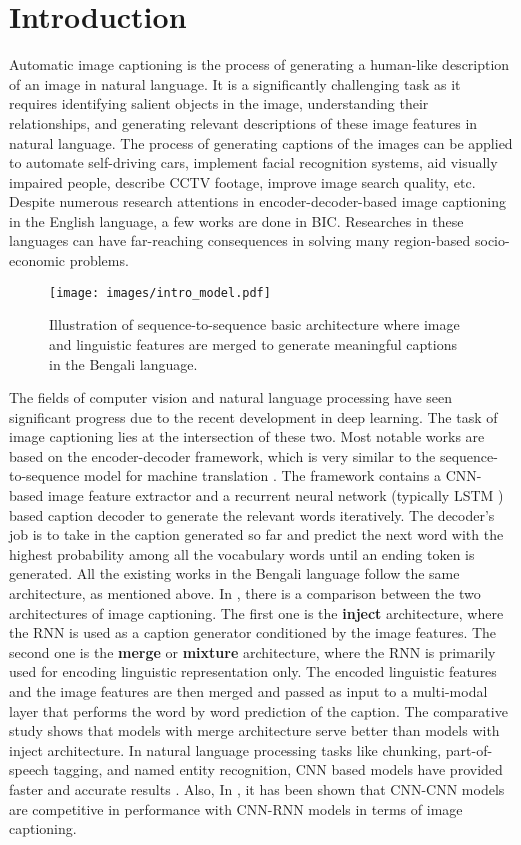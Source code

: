 \documentclass[runningheads]{llncs}
\begin{document}
\section{Introduction}
Automatic image captioning is the process of generating a human-like description of an image in natural language. It is a significantly challenging task as it requires identifying salient objects in the image, understanding their relationships, and generating relevant descriptions of these image features in natural language. The process of generating captions of the images can be applied to automate self-driving cars, implement facial recognition systems, aid visually impaired people, describe CCTV footage, improve image search quality, etc. Despite numerous research attentions in encoder-decoder-based image captioning in the English language, a few works are done in BIC. Researches in these languages can have far-reaching consequences in solving many region-based socio-economic problems.

\begin{figure}
\texttt{[image: images/intro\_model.pdf]}
\caption{Illustration of sequence-to-sequence basic architecture where image and linguistic features are merged to generate meaningful captions in the Bengali language.}
\label{figintro}
\end{figure}

The fields of computer vision and natural language processing have seen significant progress due to the recent development in deep learning. The task of image captioning lies at the intersection of these two. Most notable works are based on the encoder-decoder framework, which is very similar to the sequence-to-sequence model for machine translation \cite{mt1}. The framework contains a CNN-based image feature extractor and a recurrent neural network (typically LSTM \cite{lstm}) based caption decoder to generate the relevant words iteratively. The decoder's job is to take in the caption generated so far and predict the next word with the highest probability among all the vocabulary words until an ending token is generated. All the existing works in the Bengali language \cite{chittron,oboyob} follow the same architecture, as mentioned above. In \cite{role_of_rnn}, there is a comparison between the two architectures of image captioning. The first one is the \textbf{inject} architecture, where the RNN is used as a caption generator conditioned by the image features. The second one is the \textbf{merge} or \textbf{mixture} architecture, where the RNN is primarily used for encoding linguistic representation only. The encoded linguistic features and the image features are then merged and passed as input to a multi-modal layer that performs the word by word prediction of the caption. The comparative study shows that models with merge architecture serve better than models with inject architecture. In natural language processing tasks like chunking, part-of-speech tagging, and named entity recognition, CNN based models have provided faster and accurate results \cite{nlp_from_scratch}. Also, In \cite{cnn+cnn}, it has been shown that CNN-CNN models are competitive in performance with CNN-RNN models in terms of image captioning.
\end{document}

